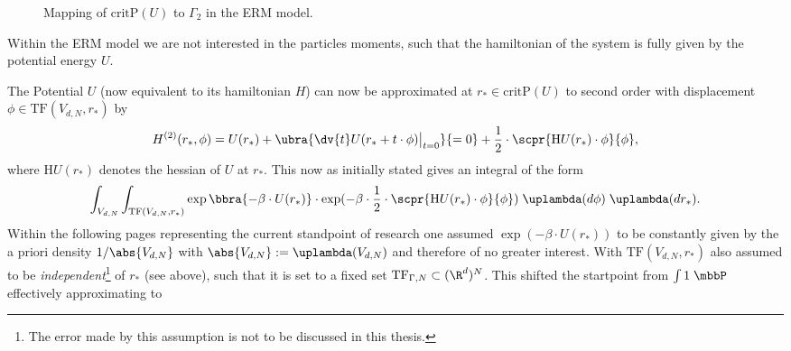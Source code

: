 \begin{figure}[H]
    \centering
    \caption{Mapping of $\text{critP}(U)$ to $\Gamma_2$ in the ERM model.}
    \label{fig:ERMmapping}
\end{figure}
Within the ERM model we are not interested in the particles moments, such that the hamiltonian of the system is fully given by the potential energy $U$.

The Potential $U$ (now equivalent to its hamiltonian $H$) can now be approximated at $r_*\in \text{critP}(U)$ to second order with displacement $\phi\in\text{TF}(V_{d,N},r_*)$ by 
\[
    H^{(2)}(r_*,\phi) = U(r_*) + \ubra{\dv{t}U(r_*+t\cdot\phi)\big|_{t=0}}{=0} + \frac{1}{2}\cdot\scpr{\text{H}U(r_*)\cdot\phi}{\phi},
\]
where $\text{H}U(r_*)$ denotes the hessian of $U$ at $r_*$. This now as initially stated gives an integral of the form
\[
    \int_{V_{d,N}}\int_{\text{TF}(V_{d,N},r_*)}\exp\bbra{-\beta\cdot U(r_*)}\cdot\exp(-\beta\cdot\frac{1}{2}\cdot\scpr{\text{H}U(r_*)\cdot\phi}{\phi})\;\uplambda(d\phi)\;\uplambda(dr_*).
\]
Within the following pages representing the current standpoint of research one assumed $\exp(-\beta\cdot U(r_*))$ to be constantly given by the a priori density $1/\abs{V_{d,N}}$ with $\abs{V_{d,N}}:=\uplambda(V_{d,N})$ and therefore of no greater interest. With $\text{TF}(V_{d,N},r_*)$ also assumed to be \emph{independent}\footnote{The error made by this assumption is not to be discussed in this thesis.} of $r_*$ (see above), such that it is set to a fixed set $\text{TF}_{\Gamma,N}\subset(\R^d)^N$. This shifted the startpoint from $\int 1\;\mbbP$ effectively approximating to
